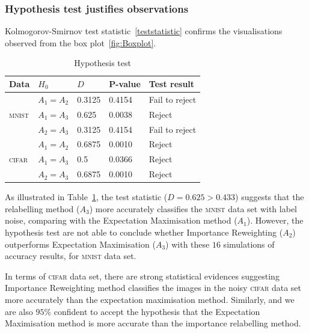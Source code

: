 \documentclass[12pt]{article} %
\begin{document}
\subsubsection{Hypothesis test justifies observations}
Kolmogorov-Smirnov test statistic~\eqref{teststatistic} confirms the visualisations observed from the box plot~\ref{fig:Boxplot}.
\begin{table}%
\centering
 	\caption{Hypothesis test}
	\begin{tabular}{lllll}
\toprule
Data & $H_0$ & $D$ & P-value & Test result\\
\midrule
 & $A_1= A_2$  &0.3125 & 0.4154 & Fail to reject\\

 \textsc{mnist} & $A_1= A_3$ & 0.625 & 0.0038 & Reject\\

  & $A_2= A_3$ & 0.3125 & 0.4154 & Fail to reject\\
\midrule
   & $A_1= A_2$ & 0.6875 & 0.0010 & Reject\\

 \textsc{cifar}  & $A_1= A_3$ & 0.5 & 0.0366 & Reject\\

  &  $A_2=A_3$  & 0.6875 & 0.0010 & Reject\\
\bottomrule
\end{tabular}

	\label{tab:HypothesisTest}
\end{table}
As illustrated in  Table~\ref{tab:HypothesisTest}, the test statistic ($D=0.625>0.433$) suggests that the relabelling method ($A_3$) more accurately classifies the \textsc{mnist} data set with label noise, comparing with the Expectation Maximisation method ($A_1$).
However, the hypothesis test are not able to conclude whether Importance Reweighting ($A_2$) outperforms Expectation Maximisation ($A_3$) with these $16$ simulations of accuracy results, for \textsc{mnist} data set.

In terms of \textsc{cifar} data set, there are strong statistical evidences suggesting Importance Reweighting method classifies the images in the noisy \textsc{cifar} data set more accurately than the expectation maximisation method. Similarly, and we are also $95\%$ confident to accept the hypothesis that the Expectation Maximisation method is more accurate than the importance relabelling method.
\end{document}
